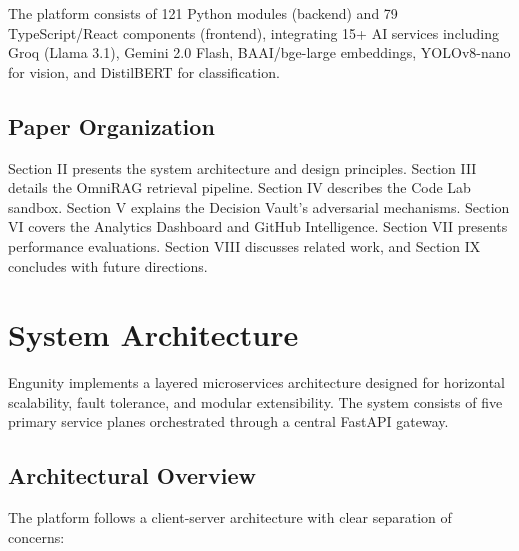 \documentclass[conference]{IEEEtran}
\begin{document}
The platform consists of 121 Python modules (backend) and 79 TypeScript/React components (frontend), integrating 15+ AI services including Groq (Llama 3.1), Gemini 2.0 Flash, BAAI/bge-large embeddings, YOLOv8-nano for vision, and DistilBERT for classification.

\subsection{Paper Organization}

Section II presents the system architecture and design principles. Section III details the OmniRAG retrieval pipeline. Section IV describes the Code Lab sandbox. Section V explains the Decision Vault's adversarial mechanisms. Section VI covers the Analytics Dashboard and GitHub Intelligence. Section VII presents performance evaluations. Section VIII discusses related work, and Section IX concludes with future directions.


\section{System Architecture}

Engunity implements a layered microservices architecture designed for horizontal scalability, fault tolerance, and modular extensibility. The system consists of five primary service planes orchestrated through a central FastAPI gateway.

\subsection{Architectural Overview}

The platform follows a client-server architecture with clear separation of concerns:
\end{document}
